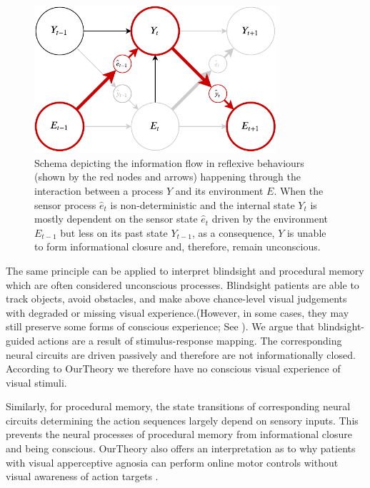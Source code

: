 \documentclass[utf8]{article}
\begin{document}
        		\begin{figure}[H]
        			\includegraphics[width=0.8\textwidth]{Submission/Frontiers/Reflexive.pdf}
        			\caption{
        			    Schema depicting the information flow in reflexive behaviours (shown by the red nodes and arrows) happening through the interaction between a process $Y$ and its environment $E$. When the sensor process $\hat{e}_t$ is  non-deterministic and the internal state $Y_t$ is mostly dependent on the sensor state $\hat{e}_t$ driven by the environment $E_{t-1}$ but less on its past state $Y_{t-1}$, as a consequence, $Y$ is unable to form informational closure and, therefore, remain unconscious.}
        			\label{fig:reflexive}
        		\end{figure}                                 
                
                The same principle can be applied to interpret blindsight \citep{humphrey1999history, humphrey1974vision, Humphrey1970} and procedural memory \citep{doyon2009contributions, ashby2010cortical} which are often considered unconscious processes.
        		Blindsight patients are able to track objects, avoid obstacles, and make above chance-level visual judgements with degraded or missing visual experience.(However, in some cases, they may still preserve some forms of conscious experience; See \cite{overgaard2011visual, mazzi2016blind}). We argue that blindsight-guided actions are a result of 
        		stimulus-response mapping. The corresponding neural circuits are driven passively and therefore are not informationally closed. According to \ac{OurTheory} we therefore have no conscious visual experience of visual stimuli.
        		
        		Similarly, for procedural memory, the state transitions of corresponding neural circuits determining the action sequences largely depend on  sensory inputs. This prevents the neural processes of procedural memory from informational closure and being conscious.
        		\ac{OurTheory} also offers an interpretation as to why patients with visual apperceptive agnosia \citep{james2003ventral} can perform online motor controls without visual awareness of action targets \citep{10.3389/fneur.2014.00255}.
        		
\end{document}
